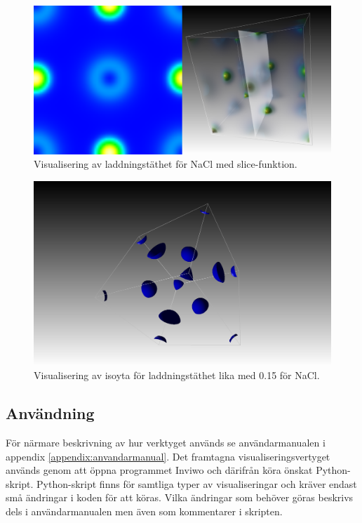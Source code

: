\documentclass[a4paper,12pt,twoside,openright]{report}
\begin{document}
\begin{figure}[H]
	\centering
	\includegraphics[scale=0.15]{NaCl_laddningstathet_slice_visualisering.png}
	\caption{Visualisering av laddningstäthet för NaCl med slice-funktion.}
	\label{fig:visualisering_NaCl_slice}
\end{figure}

\begin{figure}[H]
	\centering
	\includegraphics[scale=0.15]{NaCl_laddningstathet_iso_visualisering.png}
	\caption{Visualisering av isoyta för laddningstäthet lika med 0.15 för NaCl.}
	\label{fig:visualisering_NaCl_iso}
\end{figure}

\subsection{Användning}
För närmare beskrivning av hur verktyget används se användarmanualen i appendix \ref{appendix:anvandarmanual}. Det framtagna visualiseringsvertyget används genom att öppna programmet Inviwo och därifrån köra önskat Python-skript. Python-skript finns för samtliga typer av visualiseringar och kräver endast små ändringar i koden för att köras. Vilka ändringar som behöver göras beskrivs dels i användarmanualen men även som kommentarer i skripten.
\end{document}
